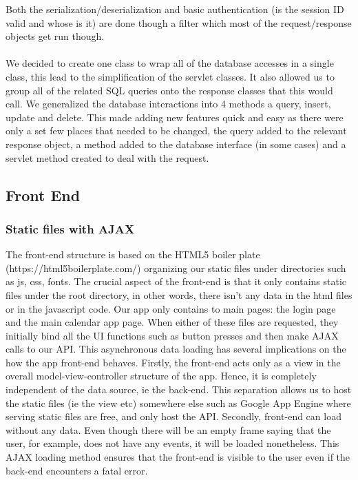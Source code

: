 \documentclass[10pt,a4paper]{article}
\begin{document}
Both the serialization/deserialization and basic authentication (is the session ID valid and whose is it) are done though a filter which most of the request/response objects get run though.
\\
\\
\noindent We decided to create one class to wrap all of the database accesses in a single class, this lead to the simplification of the servlet classes. It also allowed us to group all of the related SQL queries onto the response classes that this would call. We generalized the database interactions into 4 methods a query, insert, update and delete. This made adding new features quick and easy as there were only a set few places that needed to be changed, the query added to the relevant response object, a method added to the database interface (in some cases) and a servlet method created to deal with the request.   

\subsection{Front End}
\subsubsection{Static files with AJAX}
The front-end structure is based on the HTML5 boiler plate (https://html5boilerplate.com/) organizing our static files under directories such as js, css, fonts. The crucial aspect of the front-end is that it only contains static files under the root directory, in other words, there isn't any data in the html files or in the javascript code. Our app only contains to main pages: the login page and the main calendar app page. When either of these files are requested, they initially bind all the UI functions such as button presses and then make AJAX calls to our API. This asynchronous data loading has several implications on the how the app front-end behaves. Firstly, the front-end acts only as a view in the overall model-view-controller structure of the app. Hence, it is completely independent of the data source, ie the back-end. This separation allows us to host the static files (ie the view etc) somewhere else such as Google App Engine where serving static files are free, and only host the API. Secondly, front-end can load without any data. Even though there will be an empty frame saying that the user, for example, does not have any events, it will be loaded nonetheless. This AJAX loading method ensures that the front-end is visible to the user even if the back-end encounters a fatal error.
\end{document}

